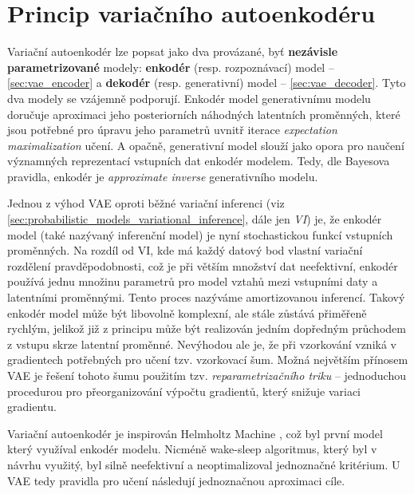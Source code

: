 \newpage
\section{Princip variačního autoenkodéru}
Variační autoenkodér lze popsat jako dva provázané, byť \textbf{nezávisle parametrizované} modely: \textbf{enkodér} (resp. rozpoznávací) model – \autoref{sec:vae_encoder} a \textbf{dekodér} (resp. generativní) model – \autoref{sec:vae_decoder}.
Tyto dva modely se vzájemně podporují. Enkodér model generativnímu modelu doručuje aproximaci jeho posteriorních náhodných latentních proměnných,
které jsou potřebné pro úpravu jeho parametrů uvnitř iterace \emph{expectation maximalization} učení.
A opačně, generativní model slouží jako opora pro naučení významných reprezentací vstupních dat enkodér modelem.
Tedy, dle Bayesova pravidla, enkodér je \emph{approximate inverse} generativního modelu. \cite{Kingma2019}

Jednou z výhod VAE oproti běžné variační inferenci (viz \autoref{sec:probabilistic_models_variational_inference}, dále jen \emph{VI}) je, že enkodér model (také nazývaný inferenční model) je nyní stochastickou funkcí vstupních proměnných.
Na rozdíl od VI, kde má každý datový bod vlastní variační rozdělení pravděpodobnosti, což je při větším množství dat neefektivní,
enkodér používá jednu množinu parametrů pro model vztahů mezi vstupními daty a latentními proměnnými. Tento proces nazýváme amortizovanou inferencí.
Takový enkodér model může být libovolně komplexní, ale stále zůstává přiměřeně rychlým, jelikož již z principu může být realizován jedním dopředným průchodem z vstupu skrze latentní proměnné.
Nevýhodou ale je, že při vzorkování vzniká v gradientech potřebných pro učení tzv. vzorkovací šum. Možná největším přínosem VAE je řešení tohoto šumu použitím tzv. \emph{reparametrizačního triku} – jednoduchou procedurou pro přeorganizování výpočtu gradientů, který snižuje variaci gradientu. \cite{Kingma2019}

Variační autoenkodér je inspirován Helmholtz Machine \cite{Dayan1995}, což byl první model který využíval enkodér modelu.
Nicméně wake-sleep algoritmus, který byl v návrhu využitý, byl silně neefektivní a neoptimalizoval jednoznačné kritérium.
U VAE tedy pravidla pro učení následují jednoznačnou aproximaci cíle. \cite{Kingma2019}

